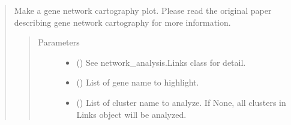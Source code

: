 \documentclass[letterpaper,10pt,english]{sphinxmanual}
\begin{document}
\begin{quote}
\begin{fulllineitems}
\begin{fulllineitems}
\end{fulllineitems}


\begin{fulllineitems}
\label{\detokenize{modules/celloracle.network_analysis:celloracle.network_analysis.Links.plot_cartography_scatter_per_cluster}}
Make a gene network cartography plot.
Please read the original paper describing gene network cartography for more information.
\begin{quote}\begin{description}
\item[{Parameters}] \leavevmode\begin{itemize}
\item {} 
 ({\hyperref[\detokenize{modules/celloracle:celloracle.Links}]{}}) \textendash{} See network\_analysis.Links class for detail.

\item {} 
 () \textendash{} List of gene name to highlight.

\item {} 
 () \textendash{} List of cluster name to analyze. If None, all clusters in Links object will be analyzed.


\end{itemize}
\end{description}
\end{quote}
\end{fulllineitems}
\end{fulllineitems}
\end{quote}
\end{document}
